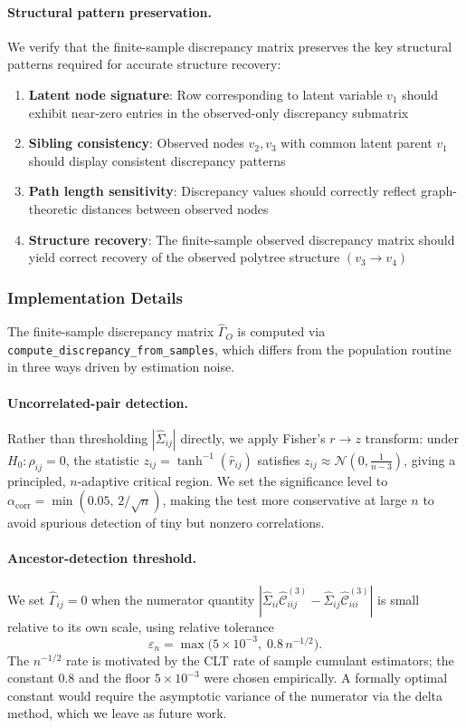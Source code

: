 \documentclass[11pt,a4paper]{article}
\numberwithin{equation}{section}
\begin{document}
\paragraph{Structural pattern preservation.} We verify that the finite-sample discrepancy matrix preserves the key structural patterns required for accurate structure recovery:
\begin{enumerate}[label=(\roman*)]
\item \textbf{Latent node signature}: Row corresponding to latent variable $v_1$ should exhibit near-zero entries in the observed-only discrepancy submatrix
\item \textbf{Sibling consistency}: Observed nodes $v_2, v_3$ with common latent parent $v_1$ should display consistent discrepancy patterns
\item \textbf{Path length sensitivity}: Discrepancy values should correctly reflect graph-theoretic distances between observed nodes
\item \textbf{Structure recovery}: The finite-sample observed discrepancy matrix should yield correct recovery of the observed polytree structure $(v_3 \to v_4)$
\end{enumerate}

\subsubsection{Implementation Details}
\label{subsubsec:fs_implementation}

The finite-sample discrepancy matrix $\hat\Gamma_O$ is computed via
\texttt{compute\_discrepancy\_from\_samples}, which differs from the
population routine in three ways driven by estimation noise.

\paragraph{Uncorrelated-pair detection.}
Rather than thresholding $|\hat\Sigma_{ij}|$ directly, we apply Fisher's
$r\to z$ transform: under $H_0\colon\rho_{ij}=0$, the statistic
$z_{ij}=\tanh^{-1}(\hat r_{ij})$ satisfies $z_{ij}\approx\mathcal{N}(0,
\tfrac{1}{n-3})$, giving a principled, $n$-adaptive critical region.  We
set the significance level to $\alpha_{\text{corr}}=\min(0.05,\,2/\sqrt{n})$,
making the test more conservative at large $n$ to avoid spurious detection
of tiny but nonzero correlations.

\paragraph{Ancestor-detection threshold.}
We set $\hat\Gamma_{ij}=0$ when the numerator quantity
$|\hat\Sigma_{ii}\hat{\mathcal{C}}^{(3)}_{iij}-\hat\Sigma_{ij}\hat{\mathcal{C}}^{(3)}_{iii}|$
is small relative to its own scale, using relative tolerance
\[
  \varepsilon_n = \max\!\bigl(5\times10^{-3},\;0.8\,n^{-1/2}\bigr).
\]
The $n^{-1/2}$ rate is motivated by the CLT rate of sample cumulant
estimators; the constant $0.8$ and the floor $5\times10^{-3}$ were chosen
empirically.  A formally optimal constant would require the asymptotic
variance of the numerator via the delta method, which we leave as future
work.
\end{document}
